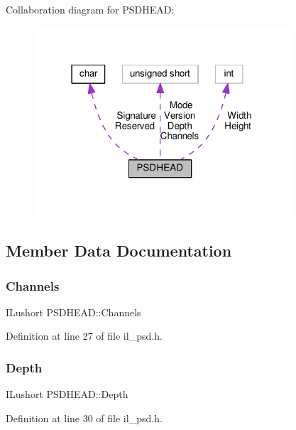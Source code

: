Collaboration diagram for P\+S\+D\+H\+E\+AD\+:
\nopagebreak
\begin{figure}[H]
\begin{center}
\leavevmode
\includegraphics[width=271pt]{d0/db6/structPSDHEAD__coll__graph}
\end{center}
\end{figure}


\subsection{Member Data Documentation}
\mbox{\label{structPSDHEAD_a76549d623d017e9f3567d373cb753a10}} 
\subsubsection{\texorpdfstring{Channels}{Channels}}
{\footnotesize\ttfamily I\+Lushort P\+S\+D\+H\+E\+A\+D\+::\+Channels}



Definition at line 27 of file il\+\_\+psd.\+h.

\mbox{\label{structPSDHEAD_a8a7fc9bff101b457a8ccedfd097f180e}} 
\subsubsection{\texorpdfstring{Depth}{Depth}}
{\footnotesize\ttfamily I\+Lushort P\+S\+D\+H\+E\+A\+D\+::\+Depth}



Definition at line 30 of file il\+\_\+psd.\+h.

